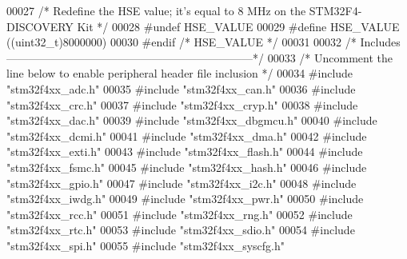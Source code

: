 \begin{DoxyCode}
00027 \textcolor{comment}{/* Redefine the HSE value; it's equal to 8 MHz on the STM32F4-DISCOVERY Kit */}
00028  \textcolor{preprocessor}{#}\textcolor{preprocessor}{undef} \textcolor{preprocessor}{HSE\_VALUE}
00029  \textcolor{preprocessor}{#}\textcolor{preprocessor}{define} \textcolor{preprocessor}{HSE\_VALUE}    \textcolor{preprocessor}{(}\textcolor{preprocessor}{(}\textcolor{preprocessor}{uint32\_t}\textcolor{preprocessor}{)}8000000\textcolor{preprocessor}{)}
00030 \textcolor{preprocessor}{#}\textcolor{preprocessor}{endif} \textcolor{comment}{/* HSE\_VALUE */}
00031 
00032 \textcolor{comment}{/* Includes ------------------------------------------------------------------*/}
00033 \textcolor{comment}{/* Uncomment the line below to enable peripheral header file inclusion */}
00034 \textcolor{preprocessor}{#}\textcolor{preprocessor}{include} "stm32f4xx_adc.h"
00035 \textcolor{preprocessor}{#}\textcolor{preprocessor}{include} "stm32f4xx_can.h"
00036 \textcolor{preprocessor}{#}\textcolor{preprocessor}{include} "stm32f4xx_crc.h"
00037 \textcolor{preprocessor}{#}\textcolor{preprocessor}{include} "stm32f4xx_cryp.h"
00038 \textcolor{preprocessor}{#}\textcolor{preprocessor}{include} "stm32f4xx_dac.h"
00039 \textcolor{preprocessor}{#}\textcolor{preprocessor}{include} "stm32f4xx_dbgmcu.h"
00040 \textcolor{preprocessor}{#}\textcolor{preprocessor}{include} "stm32f4xx_dcmi.h"
00041 \textcolor{preprocessor}{#}\textcolor{preprocessor}{include} "stm32f4xx_dma.h"
00042 \textcolor{preprocessor}{#}\textcolor{preprocessor}{include} "stm32f4xx_exti.h"
00043 \textcolor{preprocessor}{#}\textcolor{preprocessor}{include} "stm32f4xx_flash.h"
00044 \textcolor{preprocessor}{#}\textcolor{preprocessor}{include} "stm32f4xx_fsmc.h"
00045 \textcolor{preprocessor}{#}\textcolor{preprocessor}{include} "stm32f4xx_hash.h"
00046 \textcolor{preprocessor}{#}\textcolor{preprocessor}{include} "stm32f4xx_gpio.h"
00047 \textcolor{preprocessor}{#}\textcolor{preprocessor}{include} "stm32f4xx_i2c.h"
00048 \textcolor{preprocessor}{#}\textcolor{preprocessor}{include} "stm32f4xx_iwdg.h"
00049 \textcolor{preprocessor}{#}\textcolor{preprocessor}{include} "stm32f4xx_pwr.h"
00050 \textcolor{preprocessor}{#}\textcolor{preprocessor}{include} "stm32f4xx_rcc.h"
00051 \textcolor{preprocessor}{#}\textcolor{preprocessor}{include} "stm32f4xx_rng.h"
00052 \textcolor{preprocessor}{#}\textcolor{preprocessor}{include} "stm32f4xx_rtc.h"
00053 \textcolor{preprocessor}{#}\textcolor{preprocessor}{include} "stm32f4xx_sdio.h"
00054 \textcolor{preprocessor}{#}\textcolor{preprocessor}{include} "stm32f4xx_spi.h"
00055 \textcolor{preprocessor}{#}\textcolor{preprocessor}{include} "stm32f4xx_syscfg.h"

\end{DoxyCode}
